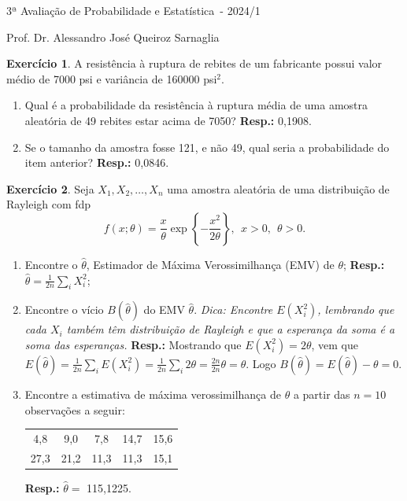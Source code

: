 \documentclass[]{article}
\newcommand{\avaliacao}{3}
\newcommand{\disciplina}{Probabilidade e Estatística}
\newcommand{\semestre}{2024/1}
\theoremstyle{definition}
\newtheorem{ex}{Exercício}
\begin{document}
\thispagestyle{empty}
\begin{center}
\Large{\avaliacao ª Avaliação de \disciplina\ - \semestre}

\large{Prof. Dr. Alessandro José Queiroz Sarnaglia}
\end{center}

\begin{ex}
A resistência à ruptura de rebites de um fabricante possui valor médio de 7000 psi e variância de 160000 psi$^2$.
\begin{enumerate}
	\item Qual é a probabilidade da resistência à ruptura média de uma amostra aleatória de 49 rebites estar acima de 7050? \textbf{Resp.:} 0,1908.
	\item Se o tamanho da amostra fosse 121, e não 49, qual seria a probabilidade do item anterior? \textbf{Resp.:} 0,0846.
\end{enumerate}
\end{ex}


\begin{ex}
Seja $X_1, X_2, \ldots, X_n$ uma amostra aleatória de uma distribuição de Rayleigh com fdp
$$
f(x;\theta) = \frac{x}{\theta}\exp\left\{-\frac{x^2}{2\theta}\right\}, \ \ x > 0, \ \ \theta>0.
$$
\begin{enumerate}
	\item Encontre o $\hat\theta$, Estimador de Máxima Verossimilhança (EMV) de $\theta$; \textbf{Resp.:} $\hat{\theta} = \frac{1}{2n}\sum_{i}X_i^2$;
	\item Encontre o vício $B(\hat{\theta})$ do EMV $\hat{\theta}$. \textit{Dica: Encontre $E(X_i^2)$, lembrando que cada $X_i$ também têm distribuição de Rayleigh e que a esperança da soma é a soma das esperanças.} \textbf{Resp.:} Mostrando que $E(X_i^2) = 2\theta$, vem que $E(\hat{\theta}) = \frac{1}{2n}\sum_{i}E(X_i^2) = \frac{1}{2n}\sum_{i}2\theta = \frac{2n}{2n}\theta = \theta$. Logo $B(\hat\theta) = E(\hat{\theta}) - \theta = 0$.
	\item Encontre a estimativa de máxima verossimilhança de $\theta$ a partir das $n = 10$ observações a seguir:
	\begin{center}
		\begin{tabular}{ccccc}
			4,8 & 9,0 & 7,8 &14,7 &15,6\\
			27,3&21,2 &11,3 &11,3 &15,1\\
		\end{tabular}
	\end{center}
	\textbf{Resp.:} $\hat\theta = $ 115,1225.
\end{enumerate}
\end{ex}
\end{document}
